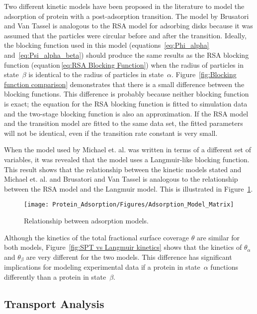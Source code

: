 Two different kinetic models have been proposed in the literature
to model the adsorption of protein with a post-adsorption transition.
The model by Brusatori and Van Tassel \cite{Brusatori1999} is analogous
to the RSA model for adsorbing disks because it was assumed that the
particles were circular before and after the transition. Ideally,
the blocking function used in this model (equations~\ref{eq:Phi_alpha}
and~\ref{eq:Psi_alpha_beta}) should produce the same results as
the RSA blocking function (equation\,\ref{eq:RSA Blocking Function})
when the radius of particles in state~$\beta$ is identical to the
radius of particles in state~$\alpha$. Figure~\ref{fig:Blocking function comparison}
demonstrates that there is a small difference between the blocking
functions. This difference is probably because neither blocking function
is exact; the equation for the RSA blocking function is fitted to
simulation data and the two-stage blocking function is also an approximation.
If the RSA model and the transition model are fitted to the same data
set, the fitted parameters will not be identical, even if the transition
rate constant is very small.

When the model used by Michael et. al. \cite{Michael2003} was written
in terms of a different set of variables, it was revealed that the
model uses a Langmuir-like blocking function. This result shows that
the relationship between the kinetic models stated and Michael et.
al. and Brusatori and Van Tassel is analogous to the relationship
between the RSA model and the Langmuir model. This is illustrated
in Figure~\ref{fig:Adsorption Model Matrix}.%
\begin{figure}
\texttt{[image: Protein\_Adsorption/Figures/Adsorption\_Model\_Matrix]}

\caption{\label{fig:Adsorption Model Matrix}Relationship between adsorption
models.}


%
\end{figure}
 Although the kinetics of the total fractional surface coverage $\theta$
are similar for both models, Figure~\ref{fig:SPT vs Langmuir kinetics}
shows that the kinetics of $\theta_{\alpha}$ and $\theta_{\beta}$
are very different for the two models. This difference has significant
implications for modeling experimental data if a protein in state~$\alpha$
functions differently than a protein in state~$\beta$.


\subsection{Transport Analysis}


